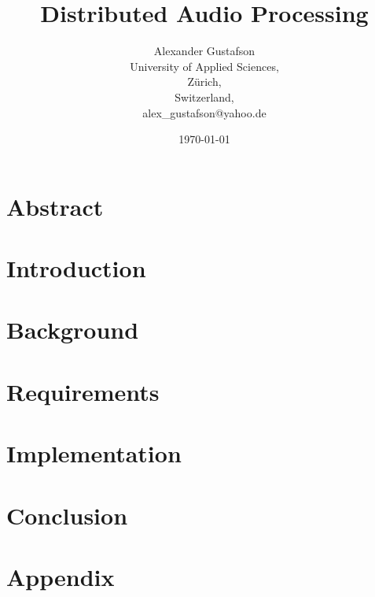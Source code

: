 \documentclass{report}
\begin{document}
\title{Distributed Audio Processing}
\author{Alexander Gustafson\\
  University of Applied Sciences,\\
  Zürich,\\
  Switzerland,\\
  alex\_gustafson@yahoo.de}
\date{\today}
\maketitle

\chapter*{Abstract}



\tableofcontents

\chapter{Introduction}



\chapter{Background}






\chapter{Requirements}







\chapter{Implementation}












\chapter{Conclusion}


{}


\chapter{Appendix}


\end{document}
